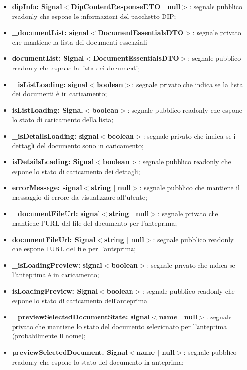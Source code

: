 \documentclass[a4paper,12pt]{article}
\begin{document}
{{{{\begin{itemize}
                    \item \textbf{dipInfo: Signal$<$DipContentResponseDTO $|$ null$>$}: segnale pubblico readonly che espone le informazioni del pacchetto DIP;
                    \item \textbf{\_documentList: signal$<$DocumentEssentialsDTO$>$}: segnale privato che mantiene la lista dei documenti essenziali;
                    \item \textbf{documentList: Signal$<$DocumentEssentialsDTO$>$}: segnale pubblico readonly che espone la lista dei documenti;
                    \item \textbf{\_isListLoading: signal$<$boolean$>$}: segnale privato che indica se la lista dei documenti è in caricamento;
                    \item \textbf{isListLoading: Signal$<$boolean$>$}: segnale pubblico readonly che espone lo stato di caricamento della lista;
                    \item \textbf{\_isDetailsLoading: signal$<$boolean$>$}: segnale privato che indica se i dettagli del documento sono in caricamento;
                    \item \textbf{isDetailsLoading: Signal$<$boolean$>$}: segnale pubblico readonly che espone lo stato di caricamento dei dettagli;
                    \item \textbf{errorMessage: signal$<$string $|$ null$>$}: segnale pubblico che mantiene il messaggio di errore da visualizzare all'utente;
                    \item \textbf{\_documentFileUrl: signal$<$string $|$ null$>$}: segnale privato che mantiene l'URL del file del documento per l'anteprima;
                    \item \textbf{documentFileUrl: Signal$<$string $|$ null$>$}: segnale pubblico readonly che espone l'URL del file per l'anteprima;
                    \item \textbf{\_isLoadingPreview: signal$<$boolean$>$}: segnale privato che indica se l'anteprima è in caricamento;
                    \item \textbf{isLoadingPreview: Signal$<$boolean$>$}: segnale pubblico readonly che espone lo stato di caricamento dell'anteprima;
                    \item \textbf{\_previewSelectedDocumentState: signal$<$name $|$ null$>$}: segnale privato che mantiene lo stato del documento selezionato per l'anteprima (probabilmente il nome);
                    \item \textbf{previewSelectedDocument: Signal$<$name $|$ null$>$}: segnale pubblico readonly che espone lo stato del documento in anteprima;

\end{itemize}}}}}
\end{document}
